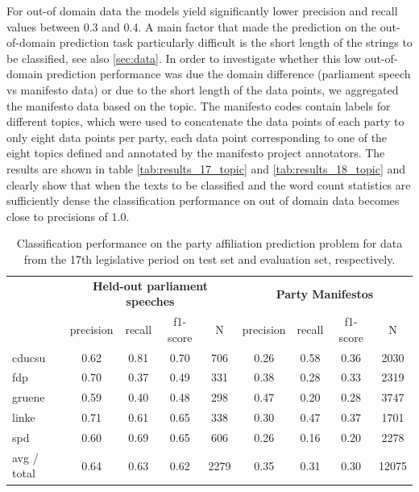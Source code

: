 \documentclass[runningheads,a4paper]{llncs}
\begin{document}
For out-of domain data the models yield significantly lower precision and recall values between 0.3 and 0.4.  
A main factor that made the prediction on the out-of-domain prediction task particularly difficult is the short length of the strings to be classified, see also \autoref{sec:data}. In order to investigate whether this low out-of-domain prediction performance was due the domain difference (parliament speech vs manifesto data) or due to the short length of the data points, we aggregated the manifesto data based on the topic. The manifesto codes contain labels for different topics, which were used to concatenate the data points of each party to only eight data points per party, each data point corresponding to one of the eight topics defined and annotated by the manifesto project annotators. The results are shown in table \autoref{tab:results_17_topic} and \autoref{tab:results_18_topic} and clearly show that when the texts to be classified and the word count statistics are sufficiently dense the classification performance on out of domain data becomes close to precisions of 1.0. 

\begin{table}[t]
\begin{center}
\begin{tabular}{lcccccccc}
& \multicolumn{4}{c}{\bf Held-out parliament speeches} & \multicolumn{4}{c}{\bf Party Manifestos}\\
    &         precision    &recall &  f1-score  & N    &         precision    &recall &  f1-score  & N\\
\hline \hline
       cducsu   &    0.62  &    0.81  &    0.70  &     706&0.26    &  0.58   &   0.36    &  2030\\
        fdp    &   0.70   &   0.37  &    0.49    &   331&0.38   &   0.28    &  0.33   &   2319\\
     gruene &      0.59  &    0.40   &   0.48   &    298&0.47  &    0.20   &   0.28 &     3747\\
      linke    &   0.71   &   0.61  &    0.65    &   338&0.30   &   0.47   &   0.37    &  1701\\
        spd   &    0.60   &   0.69  &    0.65   &    606&0.26   &   0.16   &   0.20  &    2278\\
\hline
avg / total &      0.64   &   0.63   &   0.62    &  2279 &0.35    &  0.31 &     0.30   &  12075
%
\end{tabular}
\end{center}
\caption{
\label{tab:results_17}
Classification performance on the party affiliation prediction problem for data from the 17th legislative period on test set and evaluation set, respectively.
}
\end{table}
\end{document}
